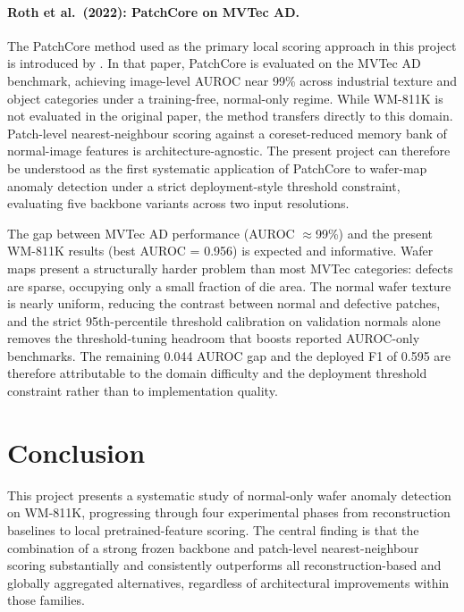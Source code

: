 \documentclass[11pt]{article}
\begin{document}
\paragraph{Roth et al.\ (2022): PatchCore on MVTec AD.}
The PatchCore method used as the primary local scoring approach in this
project is introduced by \cite{roth2022patchcore}. In that paper, PatchCore
is evaluated on the MVTec AD benchmark, achieving image-level
AUROC near 99\% across industrial texture and object categories under a
training-free, normal-only regime. While WM-811K is not evaluated in the
original paper, the method transfers directly to this domain. Patch-level
nearest-neighbour scoring against a coreset-reduced memory bank of
normal-image features is architecture-agnostic. The present project can
therefore be understood as the first systematic application of PatchCore to
wafer-map anomaly detection under a strict deployment-style threshold
constraint, evaluating five backbone variants across two input resolutions.

The gap between MVTec AD performance (AUROC $\approx$99\%) and the present
WM-811K results (best AUROC = 0.956) is expected and informative. Wafer
maps present a structurally harder problem than most MVTec categories:
defects are sparse, occupying only a small fraction of die area. The normal
wafer texture is nearly uniform, reducing the contrast between normal and
defective patches, and the strict 95th-percentile threshold calibration on
validation normals alone removes the threshold-tuning headroom that
boosts reported AUROC-only benchmarks. The remaining 0.044 AUROC gap and
the deployed F1 of 0.595 are therefore attributable to the domain
difficulty and the deployment threshold constraint rather than to
implementation quality.

\section{Conclusion}

This project presents a systematic study of normal-only wafer anomaly detection on WM-811K,
progressing through four experimental phases from reconstruction baselines to local pretrained-feature scoring.
The central finding is that the combination of a strong frozen backbone and patch-level nearest-neighbour scoring
substantially and consistently outperforms all reconstruction-based and globally aggregated alternatives,
regardless of architectural improvements within those families.
\end{document}
